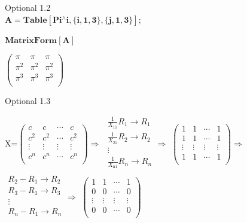 \documentclass[11pt,a4paper]{article}
\begin{document}
\begin{doublespace}
Optional 1.2\\
\noindent\(\boxed{\pmb{A=\text{Table}[\text{Pi}{}^{\wedge}i,\{i,1,3\},\{j,1,3\}];}}\)

\noindent\(\pmb{\text{MatrixForm}[A]}\)
\end{doublespace}

\begin{doublespace}
\noindent\(\left(
\begin{array}{ccc}
 \pi  & \pi  & \pi  \\
 \pi ^2 & \pi ^2 & \pi ^2 \\
 \pi ^3 & \pi ^3 & \pi ^3 \\
\end{array}
\right)\)
\end{doublespace}

Optional 1.3
\begin{mdframed}
X=\(\left(
\begin{array}{cccc}
 c & c & \cdots  & c \\
 c^2 & c^2 & \cdots  & c^2 \\
 \vdots  & \vdots  & \vdots  & \vdots  \\
 c^n & c^n & \cdots  & c^n \\
\end{array}
\right)\Rightarrow\) \(\begin{array}{c}
 \frac{1}{X_{11}}R_1\rightarrow R_1 \\
 \frac{1}{X_{21}}R_2\rightarrow R_2 \\
 \vdots  \\
 \frac{1}{X_{\text{n1}}}R_n\rightarrow R_n \\
\end{array}
\Rightarrow\) \(\left(
\begin{array}{cccc}
 1 & 1 & \cdots  & 1 \\
 1 & 1 & \cdots  & 1 \\
 \vdots  & \vdots  & \vdots  & \vdots  \\
 1 & 1 & \cdots  & 1 \\
\end{array}
\right)\Rightarrow\)\\
\(\begin{array}{c}
 R_2-R_1\rightarrow R_2 \\
 R_3-R_1\rightarrow R_3 \\
 \vdots  \\
 R_n-R_1\rightarrow R_n \\
\end{array}
\Rightarrow\) \(\left(
\begin{array}{cccc}
 1 & 1 & \cdots  & 1 \\
 0 & 0 & \cdots  & 0 \\
 \vdots  & \vdots  & \vdots  & \vdots  \\
 0 & 0 & \cdots  & 0 \\
\end{array}
\right)\)
\end{mdframed}
\end{document}
